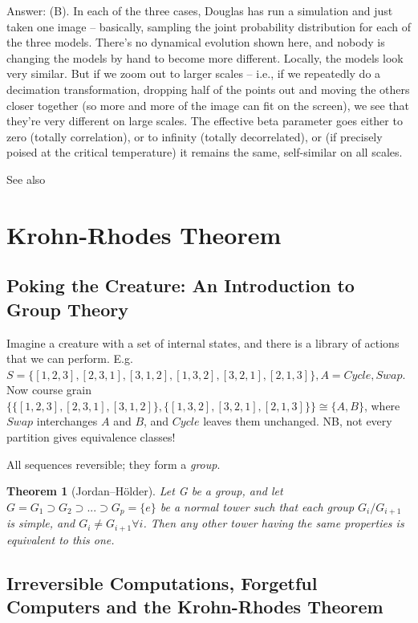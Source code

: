 \documentclass[]{article}
\newtheorem{thm}{Theorem}
\begin{document}
\begin{itemize}
	Answer: (B). In each of the three cases, Douglas has run a simulation and just taken one image -- basically, sampling the joint probability distribution for each of the three models. There's no dynamical evolution shown here, and nobody is changing the models by hand to become more different. Locally, the models look very similar. But if we zoom out to larger scales -- i.e., if we repeatedly do a decimation transformation, dropping half of the points out and moving the others closer together (so more and more of the image can fit on the screen), we see that they're very different on large scales. The effective beta parameter goes either to zero (totally correlation), or to infinity (totally decorrelated), or (if precisely poised at the critical temperature) it remains the same, self-similar on all scales.
\end{itemize}

See also \cite{dedeo2012dynamics}

\section{Krohn-Rhodes Theorem}

\subsection{Poking the Creature: An Introduction to Group Theory}

Imagine a creature with a set of internal states, and there is a library of actions that we can perform. E.g. $S=\{[1,2,3],[2,3,1],[3,1,2],[1,3,2],[3,2,1],[2,1,3]\},A={Cycle,Swap}$.
 Now course grain $\{\{[1,2,3],[2,3,1],[3,1,2]\},\{[1,3,2],[3,2,1],[2,1,3]\} \} \cong\{A,B\}$, where $Swap$ interchanges $A$ and $B$, and $Cycle$ leaves them unchanged. NB, not every partition gives equivalence classes!

All sequences reversible; they form a \textit{group}. 

\begin{thm}[Jordan–H\"older]
	Let G be a group, and let $G=G_1 \supset G_2\supset...\supset G_p=\{e\}$ be a normal tower such that each group $G_i/G_{i+1}$ is simple, and $G_i\ne G_{i+1}\forall i$. Then any other tower having the same properties is equivalent to this one.\cite{lang02}
\end{thm}
\subsection{Irreversible Computations, Forgetful Computers and the Krohn-Rhodes Theorem }
\end{document}
